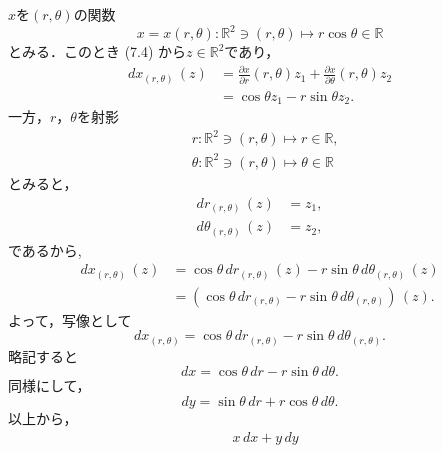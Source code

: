 


\begin{tanswer}
  $x$を$(r,\theta)$の関数
  \[
    x = x(r,\theta) \colon \mathbb{R}^2 \ni (r,\theta) \mapsto r \cos \theta \in\mathbb{R}
  \]
  とみる．このとき (7.4) から$ z\in \mathbb{R}^2$であり，
  \begin{align*}
    dx_{(r,\theta)} \, (z) & = \frac{\partial x}{\partial r} (r,\theta) z_1 + \frac{\partial x}{\partial \theta} (r,\theta) z_2 \\
                           & = \cos \theta z_1 - r \sin \theta z_2.
  \end{align*}
  一方，$r$，$\theta$を射影
  \begin{align*}
     & r \colon \mathbb{R}^2 \ni (r,\theta) \mapsto r \in \mathbb{R} ,         \\
     & \theta \colon \mathbb{R}^2 \ni (r,\theta) \mapsto \theta \in \mathbb{R}
  \end{align*}
  とみると，
  \begin{align*}
    dr_{(r,\theta)} \, (z)      & = z_1, \\
    d\theta_{(r,\theta)} \, (z) & = z_2,
  \end{align*}
  であるから,
  \begin{align*}
    dx_{(r,\theta)} \, (z) & = \cos \theta \, d r_{(r,\theta)} \, (z) - r \sin \theta \, d \theta_{(r,\theta)} \, (z) \\
                           & = (\cos \theta \, d r_{(r,\theta)} - r \sin \theta \, d \theta_{(r,\theta)}) \, (z).
  \end{align*}
  よって，写像として
  \[
    dx_{(r,\theta)} = \cos \theta \,dr_{(r,\theta)} - r \sin \theta \,d \theta_{(r,\theta)}.
  \]
  略記すると
  \[
    dx = \cos \theta \,dr - r \sin \theta \,d \theta.
  \]
  同様にして，
  \[
    dy = \sin \theta \,dr + r \cos \theta \,d \theta.
  \]
  以上から，
  \begin{align*}
      & x \, dx +y \, dy                                                                                                          \\

\end{align*}
\end{tanswer}
